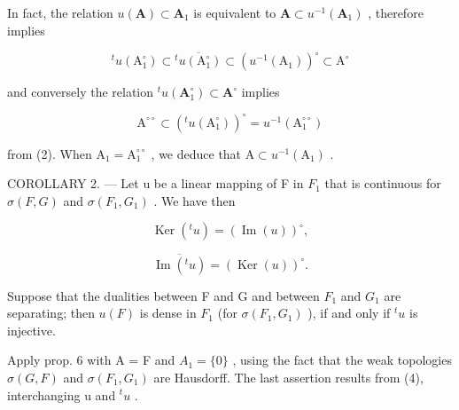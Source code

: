 In fact, the relation \(u(\mathbf{A}) \subset \mathbf{A}_1\) is equivalent to \(\mathbf{A} \subset u^{-1}(\mathbf{A}_1)\) , therefore implies

\[
{ } ^ { t } u ( \mathrm{A} _ { 1 } ^ { \circ } ) \subset \overline { { { ^ { t } u ( \mathrm{A} _ { 1 } ^ { \circ } ) } } } \subset ( u ^ { - 1 } ( \mathrm{A} _ { 1 } ) ) ^ { \circ } \subset \mathrm{A} ^ { \circ }
\]

and conversely the relation \({}^t u(\mathbf{A}_1^\circ) \subset \mathbf{A}^\circ\) implies

\[
\mathrm{A} ^ {\circ \circ} \subset \left(^ {t} u (\mathrm{A} _ {1} ^ {\circ})\right) ^ {\circ} = u ^ {- 1} (\mathrm{A} _ {1} ^ {\circ \circ})
\]

from (2). When \(\mathrm{A}_1 = \mathrm{A}_1^{\circ \circ}\) , we deduce that \(\mathrm{A} \subset u^{-1}(\mathrm{A}_1)\) .

COROLLARY 2. --- Let u be a linear mapping of F in \(F_{1}\) that is continuous for \(\sigma(F, G)\) and \(\sigma(F_{1}, G_{1})\) . We have then

\[
\operatorname{Ker} (^ {t} u) = (\operatorname{Im} (u)) ^ {\circ},\tag{3}
\]

\[
\overline {{\operatorname{Im} (^ {t} u)}} = (\operatorname{Ker} (u)) ^ {\circ}.\tag{4}
\]

Suppose that the dualities between F and G and between \(F_{1}\) and \(G_{1}\) are separating; then \(u(F)\) is dense in \(F_{1}\) (for \(\sigma(F_{1}, G_{1})\) ), if and only if \(^{t}u\) is injective.

Apply prop. 6 with A = F and \(A_{1} = \{0\}\) , using the fact that the weak topologies \(\sigma(G, F)\) and \(\sigma(F_{1}, G_{1})\) are Hausdorff. The last assertion results from (4), interchanging u and \(^{t}u\) .
